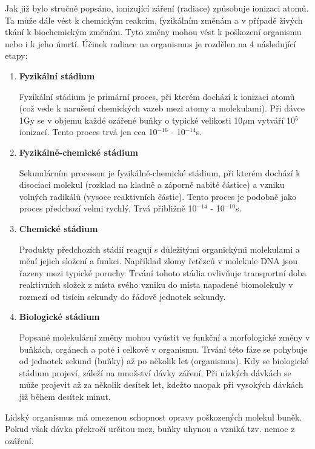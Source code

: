 Jak již bylo stručně popsáno, ionizující záření (radiace) způsobuje ionizaci atomů. Ta může dále vést k chemickým reakcím, fyzikálním změnám a v případě živých tkání k biochemickým změnám. Tyto změny mohou vést k poškození organismu nebo i k jeho úmrtí. Účinek radiace na organismus je rozdělen na 4 následující etapy: \cite{bioZarUllman}

\begin{enumerate}
	\item \textbf{Fyzikální stádium}
	
		Fyzikální stádium je primární proces, při kterém dochází k ionizaci atomů (což vede k narušení chemických vazeb mezi atomy a molekulami). Při dávce 1Gy se v objemu každé ozářené buňky o typické velikosti 10$\mu$m vytváří 10$^5$ ionizací. Tento proces trvá jen cca 10$^{-16}$ - 10$^{-14}$s.
		
	\item \textbf{Fyzikálně-chemické stádium}
	
	Sekundárním procesem je fyzikálně-chemické stádium, při kterém dochází k disociaci molekul (rozklad na kladně a záporně nabité částice) a vzniku volných radikálů (vysoce reaktivních částic). Tento proces je podobně jako proces předchozí velmi rychlý. Trvá přibližně 10$^{-14}$ - 10$^{-10}$s.	 
	
	\item \textbf{Chemické stádium}
	
	Produkty předchozích stádií reagují s důležitými organickými molekulami a mění jejich složení a funkci. Například zlomy řetězců v molekule DNA jsou řazeny mezi typické poruchy. Trvání tohoto stádia ovlivňuje transportní doba reaktivních složek z místa svého vzniku do místa napadené biomolekuly v rozmezí od tisícin sekundy do řádově jednotek sekundy.
	
	\item \textbf{Biologické stádium}
	
	Popsané molekulární změny mohou vyústit ve funkční a morfologické změny v buňkách, orgánech a poté i celkově v organismu. Trvání této fáze se pohybuje od jednotek sekund (buňky) až po několik let (organismus). Kdy se biologické stádium projeví, záleží na množství dávky záření. Při nízkých dávkách se může projevit až za několik desítek let, kdežto naopak při vysokých dávkách již během desítek minut. 
\end{enumerate}

Lidský organismus má omezenou schopnost opravy poškozených molekul buněk. Pokud však dávka překročí určitou mez, buňky uhynou a vzniká tzv. nemoc z ozáření.


